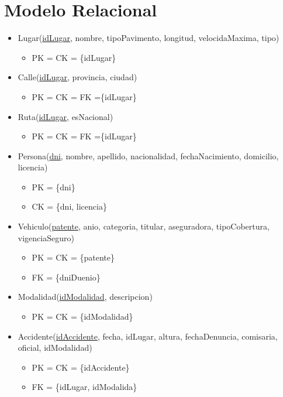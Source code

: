 \section{Modelo Relacional}

\begin{itemize}

\item Lugar(\underline{idLugar}, nombre, tipoPavimento, longitud, velocidaMaxima, tipo)
  \begin{itemize}
  \item[] PK = CK = \{idLugar\}
  \end{itemize}


\item Calle(\underline{idLugar}, provincia, ciudad)
  \begin{itemize}
  \item[] PK = CK = FK =\{idLugar\}
  \end{itemize}


\item Ruta(\underline{idLugar}, esNacional)
  \begin{itemize}
  \item[] PK = CK = FK =\{idLugar\}
  \end{itemize}


\item Persona(\underline{dni}, nombre, apellido, nacionalidad, fechaNacimiento, domicilio, licencia)
  \begin{itemize}
  \item[] PK = \{dni\}
  \item[] CK = \{dni, licencia\}
  \end{itemize}


\item Vehiculo(\underline{patente}, anio, categoria, titular, aseguradora, tipoCobertura, vigenciaSeguro)
\begin{itemize}
  \item[] PK = CK = \{patente\}
  \item[] FK = \{dniDuenio\}
  \end{itemize}


\item Modalidad(\underline{idModalidad}, descripcion)
  \begin{itemize}
  \item[] PK = CK = \{idModalidad\}
  \end{itemize}


\item Accidente(\underline{idAccidente}, fecha, idLugar, altura, fechaDenuncia, comisaria, oficial, idModalidad)
  \begin{itemize}
  \item[] PK = CK = \{idAccidente\}
  \item[] FK = \{idLugar, idModalida\}
  \end{itemize}


\end{itemize}
